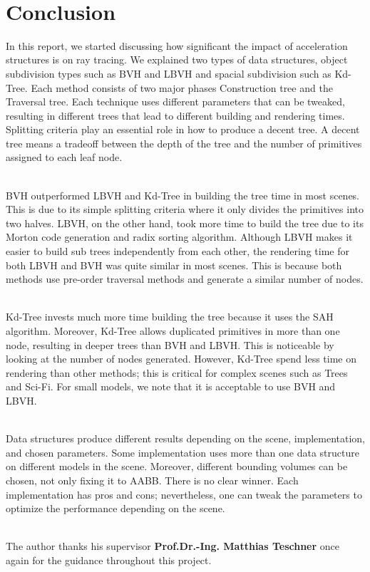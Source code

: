 \documentclass[11pt,a4paper]{article}
\begin{document}
\noindent
\\
\clearpage

\section{Conclusion}
In this report, we started discussing how significant the impact of acceleration structures is on ray tracing. We explained two types of data structures, object subdivision types such as BVH and LBVH and spacial subdivision such as Kd-Tree. Each method consists of two major phases Construction tree and the Traversal tree. Each technique uses different parameters that can be tweaked, resulting in different trees that lead to different building and rendering times. Splitting criteria play an essential role in how to produce a decent tree. A decent tree means a tradeoff between the depth of the tree and the number of primitives assigned to each leaf node.  

\noindent
\\
BVH outperformed LBVH and Kd-Tree in building the tree time in most scenes. This is due to its simple splitting criteria where it only divides the primitives into two halves. LBVH, on the other hand, took more time to build the tree due to its Morton code generation and radix sorting algorithm. Although LBVH makes it easier to build sub trees independently from each other, the rendering time for both LBVH and BVH was quite similar in most scenes. This is because both methods use pre-order traversal methods and generate a similar number of nodes.

\noindent
\\
Kd-Tree invests much more time building the tree because it uses the SAH algorithm. Moreover, Kd-Tree allows duplicated primitives in more than one node, resulting in deeper trees than BVH and LBVH. This is noticeable by looking at the number of nodes generated. However, Kd-Tree spend less time on rendering than other methods; this is critical for complex scenes such as Trees and Sci-Fi. For small models, we note that it is acceptable to use BVH and LBVH.

\noindent
\\
Data structures produce different results depending on the scene, implementation, and chosen parameters. Some implementation uses more than one data structure on different models in the scene. Moreover, different bounding volumes can be chosen, not only fixing it to AABB. There is no clear winner. Each implementation has pros and cons; nevertheless, one can tweak the parameters to optimize the performance depending on the scene.


\noindent
\\
The author thanks his supervisor \textbf{Prof.Dr.-Ing. Matthias Teschner} once again for the guidance throughout this project.
	
\clearpage



\end{document}
